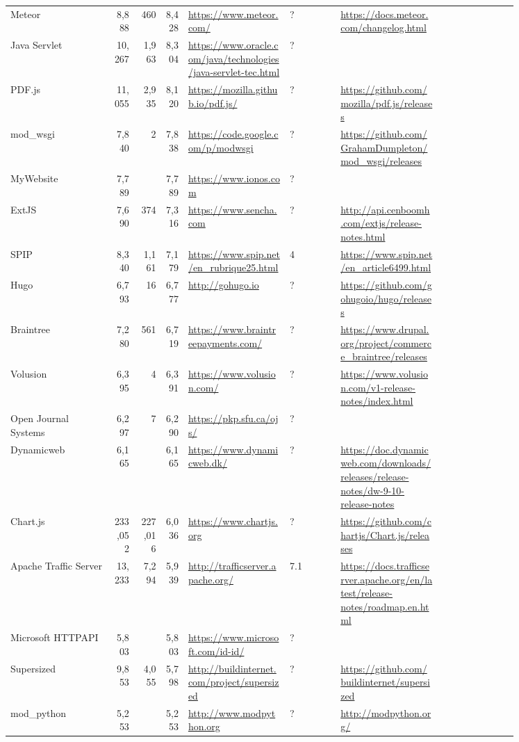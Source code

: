 \begin{longtable}{|p{0.2\linewidth}|r|r|r|p{0.2\linewidth}|p{0.1\linewidth}|p{0.2\linewidth}|p{0.15\linewidth}|}
	Meteor &8,888 &460 &8,428 &\url{https://www.meteor.com/} &? &\url{https://docs.meteor.com/changelog.html} \\
	Java Servlet &10,267 &1,963 &8,304 &\url{https://www.oracle.com/java/technologies/java-servlet-tec.html} &? & \\
	PDF.js &11,055 &2,935 &8,120 &\url{https://mozilla.github.io/pdf.js/} &? &\url{https://github.com/mozilla/pdf.js/releases} \\
	mod\_wsgi &7,840 &2 &7,838 &\url{https://code.google.com/p/modwsgi} &? &\url{https://github.com/GrahamDumpleton/mod\_wsgi/releases} \\
	MyWebsite &7,789 & &7,789 &\url{https://www.ionos.com} &? & \\
	ExtJS &7,690 &374 &7,316 &\url{https://www.sencha.com} &? &\url{http://api.cenboomh.com/extjs/release-notes.html} \\
	SPIP &8,340 &1,161 &7,179 &\url{https://www.spip.net/en\_rubrique25.html} &4 &\url{https://www.spip.net/en\_article6499.html} \\
	Hugo &6,793 &16 &6,777 &\url{http://gohugo.io} &? &\url{https://github.com/gohugoio/hugo/releases} \\
	Braintree &7,280 &561 &6,719 &\url{https://www.braintreepayments.com/} &? &\url{https://www.drupal.org/project/commerce\_braintree/releases} \\
	Volusion &6,395 &4 &6,391 &\url{https://www.volusion.com/} &? &\url{https://www.volusion.com/v1-release-notes/index.html} \\
	Open Journal Systems &6,297 &7 &6,290 &\url{https://pkp.sfu.ca/ojs/} &? & \\
	Dynamicweb &6,165 & &6,165 &\url{https://www.dynamicweb.dk/} &? &\url{https://doc.dynamicweb.com/downloads/releases/release-notes/dw-9-10-release-notes} \\
	Chart.js &233,052 &227,016 &6,036 &\url{https://www.chartjs.org} &? &\url{https://github.com/chartjs/Chart.js/releases} \\
	Apache Traffic Server &13,233 &7,294 &5,939 &\url{http://trafficserver.apache.org/} &7.1 &\url{https://docs.trafficserver.apache.org/en/latest/release-notes/roadmap.en.html} \\
	Microsoft HTTPAPI &5,803 & &5,803 &\url{https://www.microsoft.com/id-id/} &? & \\
	Supersized &9,853 &4,055 &5,798 &\url{http://buildinternet.com/project/supersized} &? &\url{https://github.com/buildinternet/supersized} \\
	mod\_python &5,253 & &5,253 &\url{http://www.modpython.org} &? &\url{http://modpython.org/} \\

\end{longtable}

